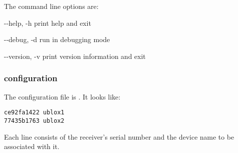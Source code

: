 The command line options are:
\begin{description*}
	\item[-{}-help, -h] print help and exit
	\item[-{}-debug, -d] run in debugging mode
	\item[-{}-version, -v] print version information and exit
\end{description*}

\subsubsection{configuration}

The configuration file is . It looks like:
\begin{lstlisting}
ce92fa1422 ublox1
77435b1763 ublox2
\end{lstlisting}
Each line consists of the receiver's serial number and the device name to be
associated with it.
